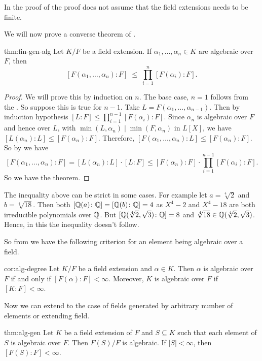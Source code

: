 \begin{note}
In the proof of \TowerLawthm the proof does not assume that the field extensions needs to be finite. 
\end{note}

We will now prove a converse theorem of \FiniteAlglem. 

\begin{Theorem}{}{thm:fin-gen-alg}
  Let $K/F$ be a field extension. 
  If $\alpha_1,\ldots,\alpha_n\in K$ are algebraic over $F$, then
  \[
    [F(\alpha_1,\ldots,\alpha_n)\colon F] \;\leq\; \prod_{i=1}^{n}[F(\alpha_i)\colon F].
  \]
\end{Theorem}

\begin{proof}
  We will prove this by induction on $n$. 
  The base case, $n=1$ follows from the \TowerLawthm. 
  So suppose this is true for $n-1$. 
  Take $L=F(\alpha_1,\ldots,\alpha_{n-1})$. 
  Then by induction hypothesis $[L:F]\leq\prod_{i=1}^{n-1}[F(\alpha_i):F]$. 
  Since $\alpha_n$ is algebraic over $F$ and hence over $L$, with $\min(L,\alpha_n)\mid\min(F,\alpha_n)$ in $L[X]$, we have $[L(\alpha_n):L]\leq[F(\alpha_n):F]$. 
  Therefore, $[F(\alpha_1,\dots, \alpha_n)\colon L]\leq [F(\alpha_n)\colon F]$. 
  So by \TowerLawthm we have 
  \[
    [F(\alpha_1,\ldots,\alpha_n):F] = [L(\alpha_n):L]\cdot[L:F] \leq [F(\alpha_n):F]\cdot\prod_{i=1}^{n-1}[F(\alpha_i):F].
  \]
  So we have the theorem. 
\end{proof}

The inequality above can be strict in some cases. 
For example let $a=\sqrt[4]{2}$ and $b=\sqrt[4]{18}$. 
Then both $[\mathbb{Q}(a)\colon \mathbb{Q}]=[\mathbb{Q}(b)\colon \mathbb{Q}]=4$ as $X^4-2$ and $X^4-18$ are both irreducible polynomials over $\mathbb{Q}$. 
But $[\mathbb{Q}(\sqrt[4]{2},\sqrt3)\colon \mathbb{Q}]=8$ and $\sqrt[4]{18}\in  \mathbb{Q}(\sqrt[4]{2},\sqrt3)$. 
Hence, in this the inequality doesn't follow. 

So from \FinGenAlgthm we have the following criterion for an element being algebraic over a field. 

\begin{corolary}{}{cor:alg-degree}
  Let $K/F$ be a field extension and $\alpha\in K$. 
  Then $\alpha$ is algebraic over $F$ if and only if $[F(\alpha):F]<\infty$. 
  Moreover, $K$ is algebraic over $F$ if $[K:F]<\infty$.
\end{corolary}

Now we can extend \FinGenAlgthm to the case of fields generated by arbitrary number of elements or extending field.
\begin{Theorem}{}{thm:alg-gen}
  Let $K$ be a field extension of $F$ and $S\subseteq K$ such that each element of $S$ is algebraic over $F$. 
  Then $F(S)/F$ is algebraic. 
  If $|S|<\infty$, then $[F(S):F]<\infty$.
\end{Theorem}

